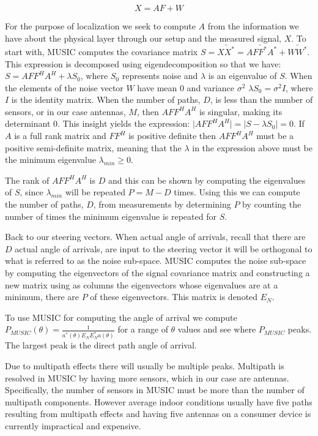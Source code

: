 \documentclass[12pt]{report}
\begin{document}
$$X = AF + W$$

For the purpose of localization we seek to compute $A$ from the information we have about the physical layer through our setup and the measured signal, $X$. To start with, MUSIC computes the covariance matrix $S = \bar{XX^{*}} = A \bar{FF^{*}} A^{*} + \bar{WW^{*}}$. This expression is decomposed using eigendecomposition so that we have: $S = A FF^{H} A^{H} + \lambda S_{0}$, where $S_{0}$ represents noise and $\lambda$ is an eigenvalue of $S$. When the elements of the noise vector $W$ have mean 0 and variance $\sigma^{2}$ $\lambda S_{0} = \sigma^{2} I$, where $I$ is the identity matrix. When the number of paths, $D$, is less than the number of sensors, or in our case antennas, $M$, then $A FF^{H} A^{H}$ is singular, making its determinant 0. This insight yields the expression: $\lvert A FF^{H} A^{H} \rvert = \lvert S - \lambda S_{0} \rvert = 0$. If $A$ is a full rank matrix and $FF^{H}$ is positive definite then $A FF^{H} A^{H}$ must be a positive semi-definite matrix, meaning that the $\lambda$ in the expression above must be the minimum eigenvalue $\lambda_{min} \geq 0$. \par

The rank of $A FF^{H} A^{H}$ is $D$ and this can be shown by computing the eigenvalues of $S$, since $\lambda_{min}$ will be repeated $P = M - D$ times. Using this we can compute the number of paths, $D$, from measurements by determining $P$ by counting the number of times the minimum eigenvalue is repeated for $S$. \par

Back to our steering vectors. When actual angle of arrivals, recall that there are $D$ actual angle of arrivals, are input to the steering vector it will be orthogonal to what is referred to as the noise sub-space. MUSIC computes the noise sub-space by computing the eigenvectors of the signal covariance matrix and constructing a new matrix using as columns the eigenvectors whose eigenvalues are at a minimum, there are $P$ of these eigenvectors. This matrix is denoted $E_{N}$. 

To use MUSIC for computing the angle of arrival we compute $P_{MUSIC}(\theta) = \frac{1}{a^{*}(\theta) E_{N} E_{N}^{*} a(\theta)}$ for a range of $\theta$ values and see where $P_{MUSIC}$ peaks. The largest peak is the direct path angle of arrival. \par

Due to multipath effects there will usually be multiple peaks. Multipath is resolved in MUSIC by having more sensors, which in our case are antennas. Specifically, the number of sensors in MUSIC must be more than the number of multipath components. However average indoor conditions usually have five paths resulting from multipath effects and having five antennas on a consumer device is currently impractical and expensive. \par
\end{document}
